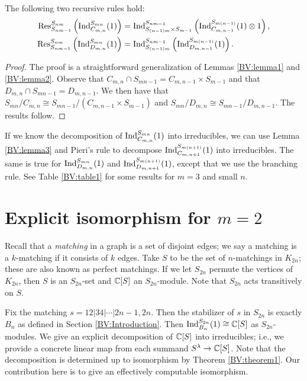\begin{lemma}\label{BV:lemma3}
The following two recursive rules hold:
\begin{align*}
\textup{Res}_{S_{nm-1}}^{S_{nm}}\left(\textup{Ind}_{C_{m,n}}^{S_{mn}}(1)\right) &= \textup{Ind}_{S_{(n-1)m} \times S_{m-1}}^{S_{nm-1}}\left(\textup{Ind}_{C_{m,n-1}}^{S_{m(n-1)}}(1) \otimes 1\right), \\
\textup{Res}_{S_{nm-1}}^{S_{nm}}\left(\textup{Ind}_{D_{m,n}}^{S_{mn}}(1)\right) &= \textup{Ind}_{S_{(n-1)m} }^{S_{nm-1}}\left(\textup{Ind}_{D_{m,n-1}}^{S_{m(n-1)}}(1)\right).
\end{align*}
\end{lemma}
\begin{proof}
The proof is a straightforward generalization of Lemmas \ref{BV:lemma1} and \ref{BV:lemma2}.
Observe that $C_{m,n} \cap S_{mn-1} = C_{m,n-1} \times S_{m-1}$ and that $D_{m,n} \cap S_{mn-1} = D_{m,n-1}$.
We then have that $S_{mn} / C_{m,n} \cong S_{mn-1} / (C_{m,n-1} \times S_{m-1})$ and 
$S_{mn} / D_{m,n} \cong S_{mn-1} / D_{m,n-1}$. The results follow.
\end{proof}
If we know the decomposition of $\textup{Ind}_{C_{m,n}}^{S_{mn}}(1)$ into irreducibles, we can use Lemma \ref{BV:lemma3} and Pieri's rule to decompose $\textup{Ind}_{C_{m,n+1}}^{S_{m(n+1)}}(1)$ into irreducibles. The same is true for $\textup{Ind}_{D_{m,n}}^{S_{mn}}(1)$ and $\textup{Ind}_{D_{m,n+1}}^{S_{m(n+1)}}(1)$, except that we use the branching rule. See Table \ref{BV:table1} for some results for $m=3$ and small $n$.

\section{Explicit isomorphism for $m=2$}\label{BV:section3}
Recall that a {\em matching} in a graph is a set of disjoint edges; we say a matching is a $k$-matching if it consists of $k$ edges. Take $S$ to be the set of $n$-matchings in $K_{2n}$; these are also known as perfect matchings. If we let $S_{2n}$ permute the vertices of $K_{2n}$, then $S$ is an $S_{2n}$-set and $\mathbb{C}[S]$ an $S_{2n}$-module. Note that $S_{2n}$ acts transitively on $S$. 

Fix the matching $s = 12|34|\cdots|2n-1,2n$. Then the stabilizer of $s$ in $S_{2n}$ is exactly $B_n$ as defined in Section 
\ref{BV:Introduction}. Then $\textup{Ind}_{B_n}^{S_{2n}}(1) \cong \mathbb{C}[S]$ as $S_{2n}$-modules. We give an explicit decomposition of $\mathbb{C}[S]$ into irreducibles; i.e., we provide a concrete linear map from each summand $S^\lambda \to \mathbb{C}[S]$. Note that the decomposition is determined up to isomorphism by Theorem \ref{BV:theorem1}. Our contribution here is to give an effectively computable isomorphism.

